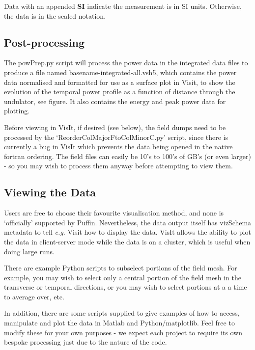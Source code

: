 \documentclass[12pt]{article}%
\begin{document}
Data with an appended {\bf SI} indicate the measurement is in SI units. Otherwise, the data is in the scaled notation.

\subsection{Post-processing}

The powPrep.py script will process the power data in the integrated data files to produce a file named basename-integrated-all.vsh5, which contains the power data normalised and formatted for use as a surface plot in Visit, to show the evolution of the temporal power profile as a function of distance through the undulator, see figure. It also contains the energy and peak power data for plotting.

Before viewing in VisIt, if desired (see below), the field dumps need to be processed by the `ReorderColMajorFtoColMinorC.py' script, since there is currently a bug in VisIt which prevents the data being opened in the native fortran ordering. The field files can easily be 10's to 100's of GB's (or even larger) - so you may wish to process them anyway before attempting to view them. 

\subsection{Viewing the Data}

Users are free to choose their favourite visualisation method, and none is `officially' supported by Puffin. Nevertheless, the data output itself has vizSchema metadata to tell \textit{e.g.} Visit how to display the data. VisIt allows the ability to plot the data in client-server mode while the data is on a cluster, which is useful when doing large runs. 

There are example Python scripts to subselect portions of the field mesh. For example, you may wish to select only a central portion of the field mesh in the transverse or temporal directions, or you may wish to select portions at a a time to average over, etc.

In addition, there are some scripts supplied to give examples of how to access, manipulate and plot the data in Matlab and Python/matplotlib. Feel free to modify these for your own purposes - we expect each project to require its own bespoke processing just due to the nature of the code.



\newpage
\end{document}
